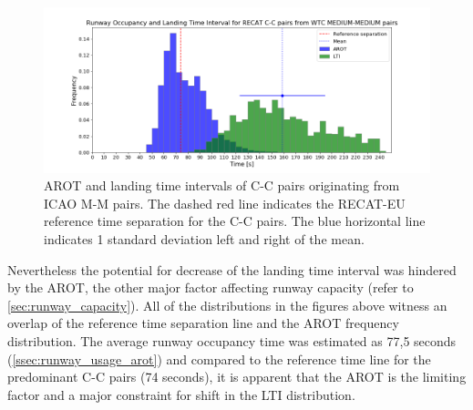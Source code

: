 \begin{figure}[h]
    \centering
    \includegraphics[width=1\textwidth]{graphics/fig_CC_from_MM_pairs_time_sep.png}
    \caption[AROT and LTI of C-C pairs originating from ICAO M-M pairs]{AROT and landing time intervals of C-C pairs originating from ICAO M-M pairs. The dashed red line indicates the RECAT-EU reference time separation for the C-C pairs. The blue horizontal line indicates 1 standard deviation left and right of the mean.}
    \label{fig:CC_from_MM_pairs_time_sep}
\end{figure}

Nevertheless the potential for decrease of the landing time interval was hindered by the AROT, the other major factor affecting runway capacity (refer to \ref{sec:runway_capacity}). All of the distributions in the figures above witness an overlap of the reference time separation line and the AROT frequency distribution. The average runway occupancy time was estimated as 77,5 seconds (\ref{ssec:runway_usage_arot}) and compared to the reference time line for the predominant C-C pairs (74 seconds), it is apparent that the AROT is the limiting factor and a major constraint for shift in the LTI distribution.









